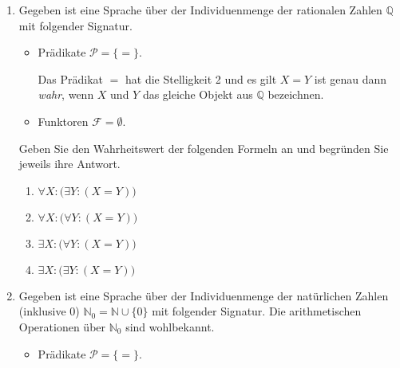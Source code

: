 \documentclass{uebungsblatt}
\begin{document}
\begin{loesung}

\end{loesung}
\newpage
\begin{aufgabe}
\begin{enumerate}
\item
Gegeben ist eine Sprache
über der Individuenmenge der rationalen Zahlen $\mathbb{Q}$
mit folgender Signatur.
\begin{itemize}
\item
Prädikate $\mathcal{P} = \{ = \}$.

Das Prädikat $=$ hat die Stelligkeit 2 und es gilt
$X = Y$ ist genau dann \textit{wahr}, wenn $X$ und $Y$ das gleiche Objekt aus $\mathbb{Q}$ bezeichnen.

\item
Funktoren $\mathcal{F} = \emptyset$.
\end{itemize}

Geben Sie den Wahrheitswert der folgenden Formeln an und
begründen Sie jeweils ihre Antwort.

\begin{enumerate}
\item 
$\forall X : \bigl( \exists Y : (X = Y) \bigr)$\\

\item 
$\forall X : \bigl( \forall Y : (X = Y) \bigr)$\\

\item 
$\exists X : \bigl( \forall Y : (X = Y) \bigr)$\\

\item 
$\exists X : \bigl( \exists Y : (X = Y) \bigr)$\\

\end{enumerate}

\item 
Gegeben ist eine Sprache
über der Individuenmenge der natürlichen Zahlen (inklusive 0)
$\mathbb{N}_0 = \mathbb{N} \cup \{0\}$ 
mit folgender Signatur. Die arithmetischen Operationen über $\mathbb{N}_0$
sind wohlbekannt.

\begin{itemize}
\item
Prädikate $\mathcal{P} = \{ = \}$.


\end{itemize}
\end{enumerate}
\end{aufgabe}
\end{document}

